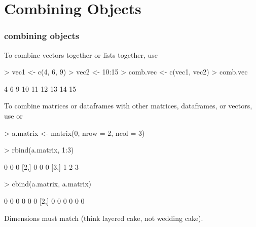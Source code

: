 \documentclass[handout]{beamer}
\newcommand{\red}{\color{red}}
\newcommand{\black}{\color{black}}
\begin{document}
\section{Combining Objects}
\begin{frame}[fragile]
\frametitle{combining objects}
To combine vectors together or lists together, use \red{\tt c()}\black
\pause
\bigskip
\red
\begin{Schunk}
\begin{Sinput}
> vec1 <- c(4, 6, 9)
> vec2 <- 10:15
> comb.vec <- c(vec1, vec2)
> comb.vec
\end{Sinput}
\begin{Soutput}
[1]  4  6  9 10 11 12 13 14 15
\end{Soutput}
\end{Schunk}
\end{frame}

\begin{frame}[fragile]
To combine matrices or dataframes with other matrices, dataframes, or vectors, use \red{\tt cbind()} \black or \red{\tt rbind()}\black
\footnotesize
\pause
\bigskip
\red
\begin{Schunk}
\begin{Sinput}
> a.matrix <- matrix(0, nrow = 2, ncol = 3)
\end{Sinput}
\end{Schunk}
\pause
\begin{Schunk}
\begin{Sinput}
> rbind(a.matrix, 1:3)
\end{Sinput}
\begin{Soutput}
     [,1] [,2] [,3]
[1,]    0    0    0
[2,]    0    0    0
[3,]    1    2    3
\end{Soutput}
\end{Schunk}
\pause
\begin{Schunk}
\begin{Sinput}
> cbind(a.matrix, a.matrix)
\end{Sinput}
\begin{Soutput}
     [,1] [,2] [,3] [,4] [,5] [,6]
[1,]    0    0    0    0    0    0
[2,]    0    0    0    0    0    0
\end{Soutput}
\end{Schunk}
\normalsize
\black
\pause
\bigskip
Dimensions must match (think layered cake, not wedding cake).
\end{frame}
\end{document}
